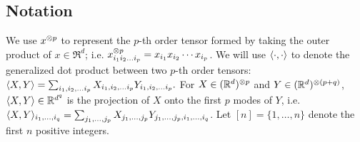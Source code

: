 




\subsection{Notation}


We use $x^{\otimes p}$ to represent the $p$-th order tensor
formed by taking the outer product of $x \in \Re^d$; i.e. $x^{\otimes p}_{i_1 i_2 \ldots
i_p} = x_{i_1} x_{i_2} \cdots x_{i_p}$. We will use
$\langle \cdot, \cdot \rangle$ to denote the generalized dot product between two $p$-th
order tensors: $\langle X, Y \rangle = \sum_{i_1, i_2, \ldots i_p} X_{i_1,
i_2, \ldots i_p} Y_{i_1, i_2, \ldots i_p}.$
For
$X \in (\mathbb{R}^d)^{\otimes p}$ and $Y \in (\mathbb{R}^d)^{\otimes (p+q)}$,%
$\langle X, Y \rangle \in \mathbb{R}^{d^q}$ is the projection of $X$ onto the first
$p$ modes of $Y$, i.e. $\langle X, Y \rangle_{i_1, \ldots, i_q}
= \sum_{j_1, \ldots, j_p} X_{j_1, \ldots, j_p} Y_{j_1, \ldots, j_p, i_1,
\ldots, i_q}$.
Let $[n] = \{ 1, \dots, n \}$ denote the first $n$ positive integers.

